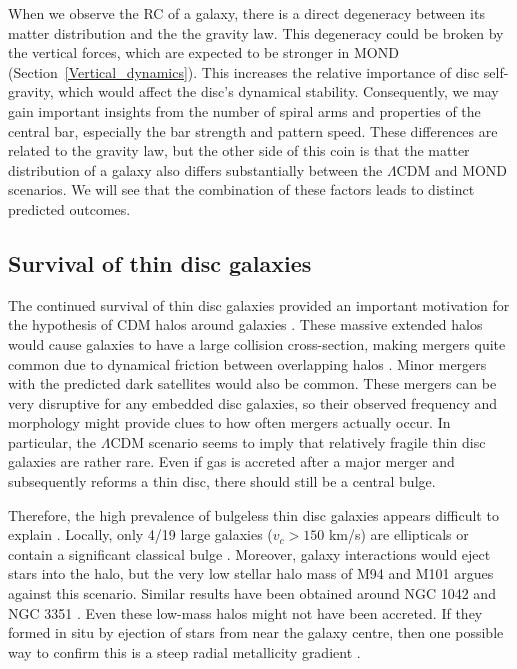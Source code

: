 \documentclass[fleqn,usenatbib,useAMS]{mnras} %
\begin{document}
When we observe the RC of a galaxy, there is a direct degeneracy between its matter distribution and the the gravity law. This degeneracy could be broken by the vertical forces, which are expected to be stronger in MOND (Section~\ref{Vertical_dynamics}). This increases the relative importance of disc self-gravity, which would affect the disc's dynamical stability. Consequently, we may gain important insights from the number of spiral arms and properties of the central bar, especially the bar strength and pattern speed. These differences are related to the gravity law, but the other side of this coin is that the matter distribution of a galaxy also differs substantially between the $\Lambda$CDM and MOND scenarios. We will see that the combination of these factors leads to distinct predicted outcomes.



\subsection{Survival of thin disc galaxies}
\label{Thin_disc_survival}

The continued survival of thin disc galaxies provided an important motivation for the hypothesis of CDM halos around galaxies \citep{Hohl_1971, Ostriker_Peebles_1973}. These massive extended halos would cause galaxies to have a large collision cross-section, making mergers quite common due to dynamical friction between overlapping halos \citep{Privon_2013, Kroupa_2015}. Minor mergers with the predicted dark satellites would also be common. These mergers can be very disruptive for any embedded disc galaxies, so their observed frequency and morphology might provide clues to how often mergers actually occur. In particular, the $\Lambda$CDM scenario seems to imply that relatively fragile thin disc galaxies are rather rare. Even if gas is accreted after a major merger and subsequently reforms a thin disc, there should still be a central bulge.

Therefore, the high prevalence of bulgeless thin disc galaxies appears difficult to explain \citep{Kautsch_2006, Graham_2008}. Locally, only 4/19 large galaxies ($v_c > 150$ km/s) are ellipticals or contain a significant classical bulge \citep{Kormendy_2010}. Moreover, galaxy interactions would eject stars into the halo, but the very low stellar halo mass of M94 \citep{Smercina_2018} and M101 \citep{van_Dokkum_2014} argues against this scenario. Similar results have been obtained around NGC 1042 and NGC 3351 \citep{Merritt_2016}. Even these low-mass halos might not have been accreted. If they formed in situ by ejection of stars from near the galaxy centre, then one possible way to confirm this is a steep radial metallicity gradient \citep{Elias_2018}.
\end{document}

